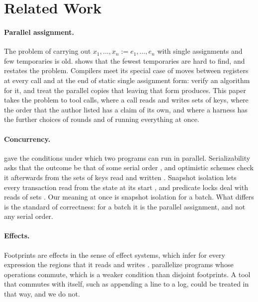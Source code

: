\documentclass[acmsmall,nonacm,screen]{acmart}
\begin{document}
\section{Related Work}\label{sec:related}

\paragraph{Parallel assignment.} The problem of carrying out $x_1, \ldots, x_n := e_1,
\ldots, e_n$ with single assignments and few temporaries is old. \citet{Sethi1973} shows that
the fewest temporaries are hard to find, and \citet{May1989} restates the problem.
Compilers meet its special case of moves between registers at every call and at the end of
static single assignment form: \citet{Rideau2008} verify an algorithm for it, and
\citet{Boissinot2009} treat the parallel copies that leaving that form produces. This paper
takes the problem to tool calls, where a call reads and writes sets of keys, where the order
that the author listed has a claim of its own, and where a harness has the further choices
of rounds and of running everything at once.

\paragraph{Concurrency.} \citet{Bernstein1966} gave the conditions under which two programs
can run in parallel. Serializability asks that the outcome be that of some serial order
\citep{Papadimitriou1979}, and optimistic schemes check it afterwards from the sets of keys
read and written \citep{KungRobinson1981}. Snapshot isolation lets every transaction read
from the state at its start \citep{Berenson1995}, and predicate locks deal with reads of
sets \citep{Eswaran1976}. Our meaning at once is snapshot isolation for a batch. What
differs is the standard of correctness: for a batch it is the parallel assignment, and not
any serial order.

\paragraph{Effects.} Footprints are effects in the sense of effect systems, which infer for
every expression the regions that it reads and writes \citep{LucassenGifford1988}.
\citet{RinardDiniz1997} parallelize programs whose operations commute, which is a weaker
condition than disjoint footprints. A tool that commutes with itself, such as appending a
line to a log, could be treated in that way, and we do not.
\end{document}
